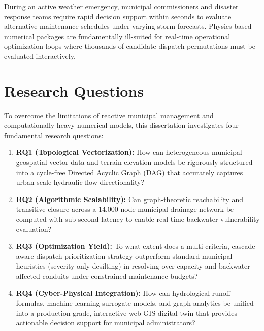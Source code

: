 During an active weather emergency, municipal commissioners and disaster response teams require rapid decision support within seconds to evaluate alternative maintenance schedules under varying storm forecasts. Physics-based numerical packages are fundamentally ill-suited for real-time operational optimization loops where thousands of candidate dispatch permutations must be evaluated interactively.

\section{Research Questions}
To overcome the limitations of reactive municipal management and computationally heavy numerical models, this dissertation investigates four fundamental research questions:
\begin{enumerate}
    \item \textbf{RQ1 (Topological Vectorization):} How can heterogeneous municipal geospatial vector data and terrain elevation models be rigorously structured into a cycle-free Directed Acyclic Graph (DAG) that accurately captures urban-scale hydraulic flow directionality?
    \item \textbf{RQ2 (Algorithmic Scalability):} Can graph-theoretic reachability and transitive closure across a 14,000-node municipal drainage network be computed with sub-second latency to enable real-time backwater vulnerability evaluation?
    \item \textbf{RQ3 (Optimization Yield):} To what extent does a multi-criteria, cascade-aware dispatch prioritization strategy outperform standard municipal heuristics (severity-only desilting) in resolving over-capacity and backwater-affected conduits under constrained maintenance budgets?
    \item \textbf{RQ4 (Cyber-Physical Integration):} How can hydrological runoff formulas, machine learning surrogate models, and graph analytics be unified into a production-grade, interactive web GIS digital twin that provides actionable decision support for municipal administrators?
\end{enumerate}

